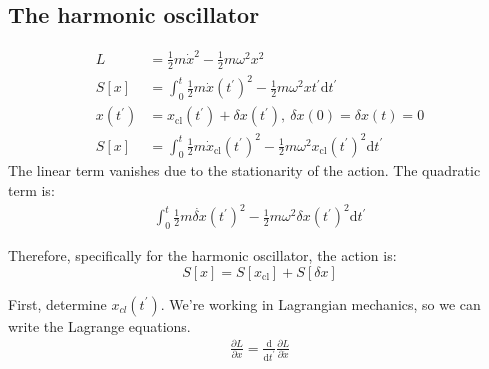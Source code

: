 \documentclass[a4paper]{extarticle}
\newcommand{\tpr}{t^\prime}
\newcommand{\dtpr}{\text{d}t^\prime}
\newcommand{\ddtpr}{\frac{\text{d}}{\text{d}t^\prime}}
\begin{document}
\subsection{The harmonic oscillator}

\begin{align*}
  L
   & = \frac{1}{2}m\dot{x}^2 - \frac{1}{2}m\omega^2 x^2                                                        \\
  S\left[ x \right]
   & = \int_{0}^{t} \frac{1}{2}m\dot{x}(\tpr)^2 - \frac{1}{2}m\omega^2 x\tpr \dtpr                             \\
  x(\tpr)
   & = x_{\text{cl}}(\tpr) + \delta x(\tpr),\ \delta x(0) = \delta x(t) = 0                                    \\
  S \left[ x \right]
   & = \int_{0}^{t} \frac{1}{2}m\dot{x}_{\text{cl}}(\tpr)^2 - \frac{1}{2}m\omega^2 x_{\text{cl}}(\tpr)^2 \dtpr
\end{align*}
The linear term vanishes due to the stationarity of the action.
The quadratic term is:
\begin{align*}
  \int_{0}^{t} \frac{1}{2}m\dot{\delta x}(\tpr)^2 - \frac{1}{2}m\omega^2 \delta x(\tpr)^2 \dtpr
\end{align*}

Therefore, specifically for the harmonic oscillator, the action is:
$$
  S\left[x\right] = S\left[x_{\text{cl}}\right] + S\left[\delta x\right]
$$

First, determine $x_{cl}(\tpr)$.
We're working in Lagrangian mechanics, so we can write the Lagrange equations.
\begin{align*}
  \frac{\partial L}{\partial x} = \ddtpr \frac{\partial L}{\partial\dot{x}}
\end{align*}
\end{document}
